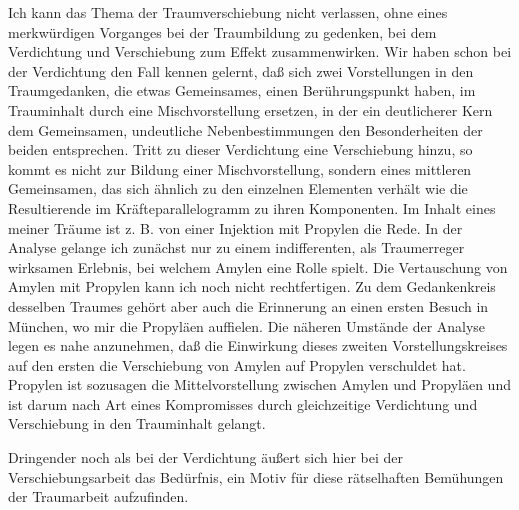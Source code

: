 \documentclass[twoside=true,titlepage=false,open=any, parskip=never, fontsize=10pt, headings=small, chapterprefix=false, appendixprefix=false]{scrbook}
\begin{document}
            
        \pstart
        Ich kann das Thema der Traumverschiebung nicht verlassen, ohne eines
               merkwürdigen Vorganges bei der Traumbildung zu gedenken, bei dem Verdichtung und
               Verschiebung zum Effekt zusammenwirken. Wir haben schon bei der Verdichtung
               den Fall kennen gelernt, daß sich zwei Vorstellungen in den Traumgedanken, die etwas Gemeinsames, einen Berührungspunkt haben, im Trauminhalt
               durch eine Mischvorstellung ersetzen, in der ein deutlicherer Kern dem
               Gemeinsamen, undeutliche Nebenbestimmungen den Besonderheiten der
               beiden entsprechen. Tritt zu dieser Verdichtung eine Verschiebung hinzu, so
               kommt es nicht zur Bildung einer Mischvorstellung, sondern eines mittleren Gemeinsamen, das sich ähnlich zu den
               einzelnen Elementen verhält wie die Resultierende im Kräfteparallelogramm zu
               ihren Komponenten. Im Inhalt eines meiner Träume ist z. B. von einer
               Injektion mit Propylen die Rede. In der Analyse
               gelange ich zunächst nur zu einem indifferenten, als Traumerreger wirksamen Erlebnis, bei welchem Amylen
               eine Rolle spielt. Die Vertauschung von Amylen mit Propylen kann ich noch
               nicht rechtfertigen. Zu dem Gedankenkreis desselben Traumes gehört aber
               auch die Erinnerung an einen ersten Besuch in München, wo mir die Propyläen auffielen. Die näheren Umstände der
               Analyse legen es nahe anzunehmen, daß die Einwirkung dieses zweiten
               Vorstellungskreises auf den ersten die Verschiebung von Amylen auf Propylen
               verschuldet hat. Propylen ist sozusagen die
               Mittelvorstellung zwischen Amylen und Propyläen und ist darum nach Art eines Kompromisses durch gleichzeitige Verdichtung und
               Verschiebung in den Trauminhalt gelangt.
        \pend
    
         
            
            
            
        \pstart
        Dringender noch als bei der Verdichtung äußert sich hier bei der
               Verschiebungsarbeit das Bedürfnis, ein Motiv für diese rätselhaften
               Bemühungen der Traumarbeit aufzufinden.
        \pend
    
         
            
            
            \pstart[\section{VI}]\pend
            
\end{document}

